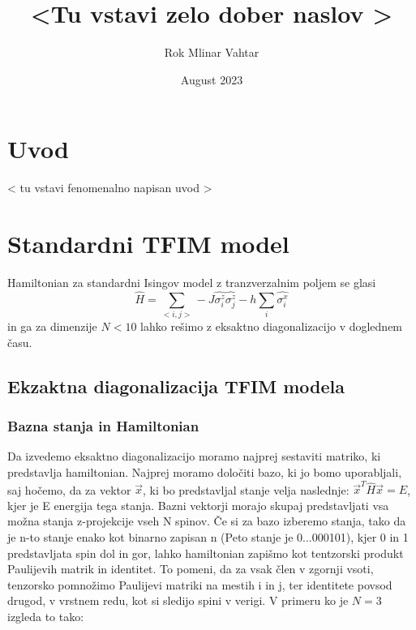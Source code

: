 \documentclass{article}
\title{\HUGE \textless Tu vstavi zelo dober naslov \textgreater}
\author{Rok Mlinar Vahtar}
\date{August 2023}
\begin{document}
\maketitle

\section{Uvod}
\textless \hspace{1pt} tu vstavi fenomenalno napisan uvod \textgreater

\tableofcontents


\section{Standardni TFIM model}
Hamiltonian za standardni Isingov model z tranzverzalnim poljem se glasi
\begin{equation}
    \hat{H} = \sum_{< i,j >} -J \hat{\sigma_i^z} \hat{\sigma_j^z} - h\sum_i \hat{\sigma_i^x}
\end{equation}
in ga za dimenzije $N < 10$ lahko rešimo z eksaktno diagonalizacijo v doglednem času. 

 \subsection{Ekzaktna diagonalizacija TFIM modela}

 \subsubsection{Bazna stanja in Hamiltonian}
Da izvedemo eksaktno diagonalizacijo moramo najprej sestaviti matriko, ki predstavlja hamiltonian. Najprej moramo določiti bazo, ki jo bomo uporabljali, saj hočemo, da za vektor $\Vec{x}$, ki bo predstavljal stanje velja naslednje: $\Vec{x}^T \hat{H} \Vec{x} = E$, kjer je E energija tega stanja. Bazni vektorji morajo skupaj predstavljati vsa možna stanja z-projekcije vseh N spinov. Če si za bazo izberemo stanja, tako da je n-to stanje enako kot binarno zapisan n (Peto stanje je 0...000101), kjer 0 in 1 predstavljata spin dol in gor, lahko hamiltonian zapišmo kot tentzorski produkt Paulijevih matrik in identitet. To pomeni, da za vsak člen v zgornji vsoti, tenzorsko pomnožimo Paulijevi matriki na mestih i in j, ter identitete povsod drugod, v vrstnem redu, kot si sledijo spini v verigi. V primeru ko je $N = 3$ izgleda to tako:
\end{document}
